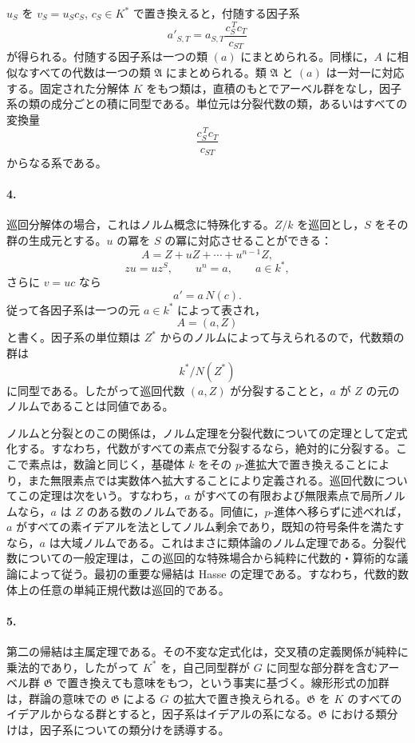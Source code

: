 \(u_S\) を \(v_S=u_Sc_S\), \(c_S\in K^*\) で置き換えると，付随する因子系
\[
        a'_{S,T}=a_{S,T}\frac{c_S^{\,T}c_T}{c_{ST}}
\]
が得られる。付随する因子系は一つの類 \((a)\) にまとめられる。同様に，\(A\) に相似なすべての代数は一つの類 \(\mathfrak A\) にまとめられる。類 \(\mathfrak A\) と \((a)\) は一対一に対応する。固定された分解体 \(K\) をもつ類は，直積のもとでアーベル群をなし，因子系の類の成分ごとの積に同型である。単位元は分裂代数の類，あるいはすべての変換量
\[
        \frac{c_S^{\,T}c_T}{c_{ST}}
\]
からなる系である。

\paragraph{4.}
巡回分解体の場合，これはノルム概念に特殊化する。\(Z/k\) を巡回とし，\(S\) をその群の生成元とする。\(u\) の冪を \(S\) の冪に対応させることができる：
\[
        A=Z+uZ+\cdots+u^{n-1}Z,
\]
\[
        zu=uz^S,\qquad u^n=a,\qquad a\in k^*,
\]
さらに \(v=uc\) なら
\[
        a'=a\,N(c).
\]
従って各因子系は一つの元 \(a\in k^*\) によって表され，
\[
        A=(a,Z)
\]
と書く。因子系の単位類は \(Z^*\) からのノルムによって与えられるので，代数類の群は
\[
        k^*/N(Z^*)
\]
に同型である。したがって巡回代数 \((a,Z)\) が分裂することと，\(a\) が \(Z\) の元のノルムであることは同値である。

ノルムと分裂とのこの関係は，ノルム定理を分裂代数についての定理として定式化する。すなわち，代数がすべての素点で分裂するなら，絶対的に分裂する。ここで素点は，数論と同じく，基礎体 \(k\) をその \(p\)-進拡大で置き換えることにより，また無限素点では実数体へ拡大することにより定義される。巡回代数についてこの定理は次をいう。すなわち，\(a\) がすべての有限および無限素点で局所ノルムなら，\(a\) は \(Z\) のある数のノルムである。同値に，\(p\)-進体へ移らずに述べれば，\(a\) がすべての素イデアルを法としてノルム剰余であり，既知の符号条件を満たすなら，\(a\) は大域ノルムである。これはまさに類体論のノルム定理である。分裂代数についての一般定理は，この巡回的な特殊場合から純粋に代数的・算術的な議論によって従う。最初の重要な帰結は Hasse の定理である。すなわち，代数的数体上の任意の単純正規代数は巡回的である。

\paragraph{5.}
第二の帰結は主属定理である。その不変な定式化は，交叉積の定義関係が純粋に乗法的であり，したがって \(K^*\) を，自己同型群が \(G\) に同型な部分群を含むアーベル群 \(\mathfrak G\) で置き換えても意味をもつ，という事実に基づく。線形形式の加群は，群論の意味での \(\mathfrak G\) による \(G\) の拡大で置き換えられる。\(\mathfrak G\) を \(K\) のすべてのイデアルからなる群とすると，因子系はイデアルの系になる。\(\mathfrak G\) における類分けは，因子系についての類分けを誘導する。

